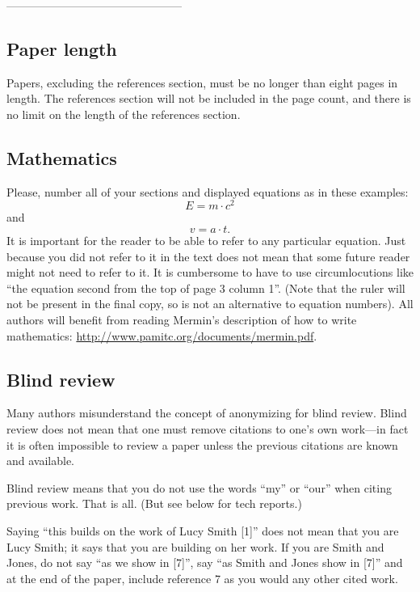 

-----------------------------------------------

\subsection{Paper length}
Papers, excluding the references section, must be no longer than eight pages in length.
The references section will not be included in the page count, and there is no limit on the length of the references section.



\subsection{Mathematics}

Please, number all of your sections and displayed equations as in these examples:
\begin{equation}
  E = m\cdot c^2
  \label{eq:important}
\end{equation}
and
\begin{equation}
  v = a\cdot t.
  \label{eq:also-important}
\end{equation}
It is important for the reader to be able to refer to any particular equation.
Just because you did not refer to it in the text does not mean that some future reader might not need to refer to it.
It is cumbersome to have to use circumlocutions like ``the equation second from the top of page 3 column 1''.
(Note that the ruler will not be present in the final copy, so is not an alternative to equation numbers).
All authors will benefit from reading Mermin's description of how to write mathematics:
\url{http://www.pamitc.org/documents/mermin.pdf}.

\subsection{Blind review}

Many authors misunderstand the concept of anonymizing for blind review.
Blind review does not mean that one must remove citations to one's own work---in fact it is often impossible to review a paper unless the previous citations are known and available.

Blind review means that you do not use the words ``my'' or ``our'' when citing previous work.
That is all.
(But see below for tech reports.)

Saying ``this builds on the work of Lucy Smith [1]'' does not mean that you are Lucy Smith;
it says that you are building on her work.
If you are Smith and Jones, do not say ``as we show in [7]'', say ``as Smith and Jones show in [7]'' and at the end of the paper, include reference 7 as you would any other cited work.

